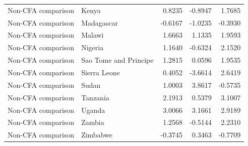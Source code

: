 \begin{table}
\begin{tabular}[t]{llrrr}
Non-CFA comparison & Kenya & 0.8235 & -0.8947 & 1.7685\\
\addlinespace
Non-CFA comparison & Madagascar & -0.6167 & -1.0235 & -0.3930\\
Non-CFA comparison & Malawi & 1.6663 & 1.1335 & 1.9593\\
Non-CFA comparison & Nigeria & 1.1640 & -0.6324 & 2.1520\\
Non-CFA comparison & Sao Tome and Principe & 1.2815 & 0.0596 & 1.9535\\
Non-CFA comparison & Sierra Leone & 0.4052 & -3.6614 & 2.6419\\
\addlinespace
Non-CFA comparison & Sudan & 1.0003 & 3.8617 & -0.5735\\
Non-CFA comparison & Tanzania & 2.1913 & 0.5379 & 3.1007\\
Non-CFA comparison & Uganda & 3.0066 & 3.1661 & 2.9189\\
Non-CFA comparison & Zambia & 1.2568 & -0.5144 & 2.2310\\
Non-CFA comparison & Zimbabwe & -0.3745 & 0.3463 & -0.7709\\
\bottomrule
\end{tabular}
\end{table}